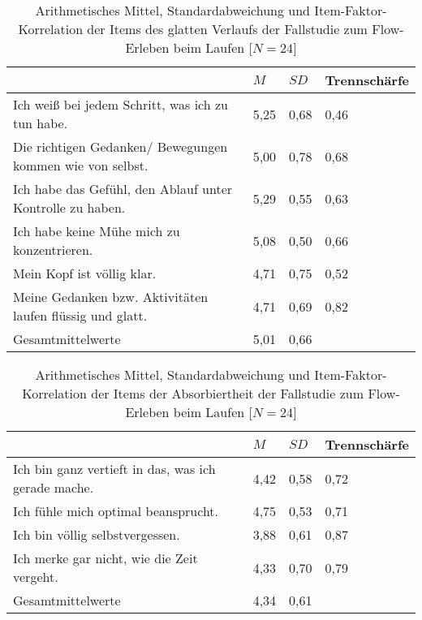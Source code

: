 \begin{table}[ht]
\centering
	\caption[Item-Faktor-Korrelation der Items des glatten Verlaufs (Fallstudie: Laufen)]{Arithmetisches Mittel, Standardabweichung und Item-Faktor-Korrelation der Items des glatten Verlaufs der Fallstudie zum Flow-Erleben beim Laufen [$N = 24$]}
	\label{tab:glatter_verlauf_fallstudie_laufen}
	\begin{tabularx}{\textwidth}{p{} p{} p{} p{}}
\toprule
& $M$ & $SD$ & Trennschärfe \\
\midrule
Ich weiß bei jedem Schritt, was ich zu tun habe. & 5,25 & 0,68 & 0,46 \\
Die richtigen Gedanken/ Bewegungen kommen wie von selbst. & 5,00 & 0,78 & 0,68 \\
Ich habe das Gefühl, den Ablauf unter Kontrolle zu haben. & 5,29 & 0,55 & 0,63 \\
Ich habe keine Mühe mich zu konzentrieren. & 5,08 & 0,50 & 0,66 \\
Mein Kopf ist völlig klar. & 4,71 & 0,75 & 0,52 \\
Meine Gedanken bzw. Aktivitäten laufen flüssig und glatt. & 4,71 & 0,69 & 0,82 \\
Gesamtmittelwerte & 5,01 & 0,66 & \\
\bottomrule
\end{tabularx}
\end{table}

\begin{table}[ht]
\centering
	\caption[Item-Faktor-Korrelation der Items der Absorbiertheit (Fallstudie: Laufen)]{Arithmetisches Mittel, Standardabweichung und Item-Faktor-Korrelation der Items der Absorbiertheit der Fallstudie zum Flow-Erleben beim Laufen [$N = 24$]}
	\label{tab:absorbiertheit_fallstudie_laufen}
	\begin{tabularx}{\textwidth}{p{} p{} p{} p{}}
\toprule
& $M$ & $SD$ & Trennschärfe \\
\midrule
Ich bin ganz vertieft in das, was ich gerade mache. & 4,42 & 0,58 & 0,72 \\
Ich fühle mich optimal beansprucht. & 4,75 & 0,53 & 0,71 \\
Ich bin völlig selbstvergessen. & 3,88 & 0,61 & 0,87 \\
Ich merke gar nicht, wie die Zeit vergeht. & 4,33 & 0,70 & 0,79 \\
Gesamtmittelwerte & 4,34 & 0,61 & \\
\bottomrule
\end{tabularx}
\end{table}

